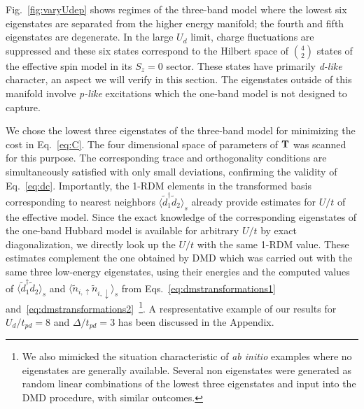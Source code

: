 Fig.~\ref{fig:varyUdep} shows regimes of the three-band model where 
the lowest six eigenstates are separated from the higher energy manifold; the 
fourth and fifth eigenstates are degenerate. 
In the large $U_d$ limit, charge fluctuations are suppressed and these six 
states correspond to the Hilbert space of $4 \choose 2$ states of the effective spin model in its $S_z=0$ sector.
These states have primarily \textit{d-like} character, an aspect we will verify in this section. 
The eigenstates outside of this manifold involve \textit{p-like} excitations which the one-band model is not designed 
to capture. 

We chose the lowest three eigenstates of the three-band model for minimizing 
the cost in Eq.~\eqref{eq:C}. The four dimensional space of parameters of ${\bf T}$ 
was scanned for this purpose. The corresponding trace and orthogonality conditions are simultaneously 
satisfied with only small deviations, confirming the validity of Eq.~\eqref{eq:dc}. 
Importantly, the 1-RDM elements in the transformed basis corresponding to nearest neighbors $\langle \tilde{d}_1^{\dagger} \tilde{d}_2 \rangle_s$ 
already provide estimates for $U/t$ of the effective model. Since the exact knowledge of the corresponding eigenstates of 
the one-band Hubbard model is available for arbitrary $U/t$ by exact diagonalization, we directly look up the $U/t$ with 
the same 1-RDM value. These estimates complement the one obtained by DMD which was carried out 
with the same three low-energy eigenstates, using their energies and 
the computed values of $\langle \tilde{d}_1^{\dagger} \tilde{d}_2 \rangle_s$ 
and $\langle \tilde{n}_{i,\uparrow} \tilde{n}_{i,\downarrow} \rangle_{s}$ from Eqs.~\eqref{eq:dmstransformations1} 
and~\eqref{eq:dmstransformations2}~\footnote{We also mimicked the situation characteristic of \textit{ab initio} 
examples where no eigenstates are generally available. Several non eigenstates were generated as random linear combinations of 
the lowest three eigenstates and input into the DMD procedure, with 
similar outcomes.}. A respresentative example of our results for $U_{d}/t_{pd}=8$ and $\Delta/t_{pd}=3$ 
has been discussed in the Appendix. 

